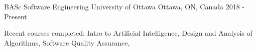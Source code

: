 
\begin{cventries}

  \cventry
    {BASc Software Engineering} %
    {University of Ottawa} %
    {Ottawa, ON, Canada} %
    {2018 - Present} %
    {
      \begin{cvitems} %
      \item {Recent courses completed: Intro to Artificial Intelligence, Design and Analysis of Algorithms, Software Quality Assurance,}
      \end{cvitems}
    }
\vspace{-0.3cm}

\end{cventries}
